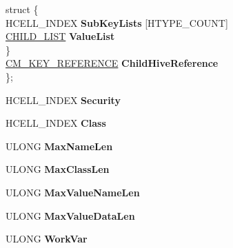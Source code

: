 \begin{DoxyCompactItemize}
\begin{tabbing}
\mbox{\label{union___c_m___k_e_y___n_o_d_e_1_1_0D3548_a4651dcf5450929ddcd94701b43373351}} 
\>struct \{\\
\>\>HCELL\_INDEX {\bfseries SubKeyLists} \mbox{[}HTYPE\_COUNT\mbox{]}\\
\>\>\hyperlink{struct___c_h_i_l_d___l_i_s_t}{CHILD\_LIST} {\bfseries ValueList}\\
\>\} \\
\>\hyperlink{struct___c_m___k_e_y___r_e_f_e_r_e_n_c_e}{CM\_KEY\_REFERENCE} {\bfseries ChildHiveReference}\\
\}; \\

\end{tabbing}\item 
\mbox{\label{struct___c_m___k_e_y___n_o_d_e_a97586bb7998e0b405f31dae9063245b0}} 
H\+C\+E\+L\+L\+\_\+\+I\+N\+D\+EX {\bfseries Security}
\item 
\mbox{\label{struct___c_m___k_e_y___n_o_d_e_aa950a4bb677530f0d0df226417e79767}} 
H\+C\+E\+L\+L\+\_\+\+I\+N\+D\+EX {\bfseries Class}
\item 
\mbox{\label{struct___c_m___k_e_y___n_o_d_e_a89af14816a43ab27a217da05e2461fca}} 
U\+L\+O\+NG {\bfseries Max\+Name\+Len}
\item 
\mbox{\label{struct___c_m___k_e_y___n_o_d_e_aa5ee2c78a1e2aa4f3dc0e228289db1ba}} 
U\+L\+O\+NG {\bfseries Max\+Class\+Len}
\item 
\mbox{\label{struct___c_m___k_e_y___n_o_d_e_a67c06b985daa8ee5911907a2803ec49d}} 
U\+L\+O\+NG {\bfseries Max\+Value\+Name\+Len}
\item 
\mbox{\label{struct___c_m___k_e_y___n_o_d_e_ab11b3986147753f9b1c739b361c08333}} 
U\+L\+O\+NG {\bfseries Max\+Value\+Data\+Len}
\item 
\mbox{\label{struct___c_m___k_e_y___n_o_d_e_ae7ef2413dbe126fbf49fd9ab234eb729}} 
U\+L\+O\+NG {\bfseries Work\+Var}
\item 

\end{DoxyCompactItemize}
